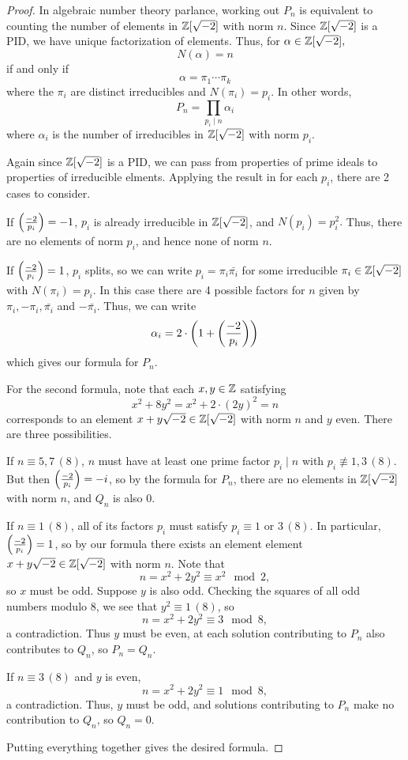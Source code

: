\documentclass[12pt, a4paper]{amsart}
\begin{document}
\begin{proof}
  In algebraic number theory parlance, working out $P_n$ is equivalent to
  counting the number of elements in ${\mathbb Z}[\sqrt{-2}]$ with norm $n$.
  Since ${\mathbb Z}[\sqrt{-2}]$ is
  a PID, we have unique factorization of elements. Thus, for
  $\alpha \in {\mathbb Z}[\sqrt{-2}],$
  \[N(\alpha) = n\]
  if and only if
  \[\alpha = \pi_1 \cdots \pi_k\]
  where the $\pi_i$ are distinct irreducibles and $N(\pi_i) =
  p_i.$ In other words,
  \[P_n = \prod\limits_{p_i \mid n} \alpha_i\]
  where $\alpha_i$ is the number of irreducibles in ${\mathbb Z}[\sqrt{-2}]$ with norm $p_i$.

  Again since ${\mathbb Z}[\sqrt{-2}]$ is a PID, we can pass from properties of prime
  ideals to properties of irreducible elments. Applying the result in
  \cite[Page 74, Theorem 25]{marcus} for each $p_i$, there are 2 cases
  to consider.

  If $\left(\frac{-2}{p_i}\right) = -1$, $p_i$ is already irreducible in ${\mathbb Z}[\sqrt{-2}]$,
  and $N(p_i) = p_i^2.$ Thus, there are no elements of norm $p_i$, and hence
  none of norm $n$.

  If $\left(\frac{-2}{p_i}\right) = 1$, $p_i$ splits, so we can write $p_i =
  \pi_i\bar{\pi_i}$ for some irreducible $\pi_i \in {\mathbb Z}[\sqrt{-2}]$ with
  $N(\pi_i) = p_i$. In this case there are 4 possible factors for $n$ given
  by $\pi_i, -\pi_i, \bar{\pi_i}$ and $-\bar{\pi_i}$. Thus, we can write
  \[\alpha_i = 2\cdot\left(1 + \left(\frac{-2}{p_i}\right)\right)\]
  which gives our formula for $P_n$.

  For the second formula, note that each $x,y \in {\mathbb Z}$ satisfying
  \[x^2 + 8y^2 = x^2 + 2\cdot(2y)^2= n\]
  corresponds to an element $x+y\sqrt{-2} \in {\mathbb Z}[\sqrt{-2}]$ with norm $n$
  and $y$ even. There are three possibilities.

  If $n \equiv 5, 7 \,(8)$, $n$ must have at least one prime factor $p_i \mid n$
  with $p_i \not\equiv 1,3 \,(8)$. But then $\left(\frac{-2}{p_i}\right) = -i$, so by the
  formula for $P_n$, there are no elements in ${\mathbb Z}[\sqrt{-2}]$ with norm $n$, and
  $Q_n$ is also 0.

  If $n \equiv 1 \, (8)$, all of its factors $p_i$ must satisfy $p_i \equiv 1
  \text{ or } 3 \,(8)$. In particular, $\left(\frac{-2}{p_i}\right) = 1$, so by our
  formula there exists an element element $x+y\sqrt{-2} \in
  {\mathbb Z}[\sqrt{-2}]$ with norm $n$. Note that
  \[n = x^2 + 2y^2 \equiv x^2 \mod{2},\]
  so $x$ must be odd. Suppose $y$ is also odd. Checking the squares of all
  odd numbers modulo 8, we see that $y^2 \equiv 1 \,(8)$, so
  \[n = x^2 + 2y^2 \equiv 3 \mod{8},\]
  a contradiction. Thus $y$ must be even, at each solution contributing to $P_n$
  also contributes to $Q_n$, so $P_n = Q_n$.

  If $n \equiv 3 \, (8)$ and $y$ is even,
  \[n = x^2 + 2y^2 \equiv 1 \mod{8},\]
  a contradiction. Thus, $y$ must be odd, and solutions contributing to $P_n$
  make no contribution to $Q_n$, so $Q_n = 0$.

  Putting everything together gives the desired formula.

\end{proof}
\end{document}
